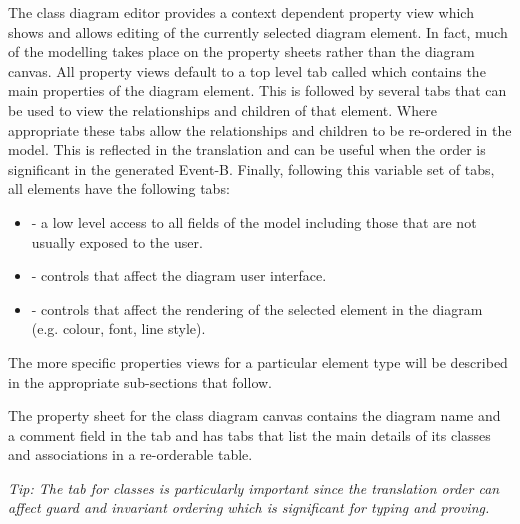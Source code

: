 \documentclass[a4paper,10pt]{article}
\begin{document}
The class diagram editor provides a context dependent property view which shows and allows editing of the currently selected diagram element.
In fact, much of the modelling takes place on the property sheets rather than the diagram canvas.
All property views default to a top level tab called  which contains the main properties of the diagram element.
This is followed by several tabs that can be used to view the relationships and children of that element.
Where appropriate these tabs allow the relationships and children to be re-ordered in the model.
This is reflected in the translation and can be useful when the order is significant in the generated Event-B.
Finally, following this variable set of tabs, all elements have the following tabs:
\begin{itemize}
	\item {} - a low level access to all fields of the model including those that are not usually exposed to the user.
	\item {} - controls that affect the diagram user interface.
	\item {} - controls that affect the rendering of the selected element in the diagram (e.g. colour, font, line style).
\end{itemize}
The more specific properties views for a particular element type will be described in the appropriate sub-sections that follow. 

The property sheet for the class diagram canvas contains the diagram name and a comment field in the  tab and has tabs that list the main details of its classes and associations in a re-orderable table.

\emph{Tip: The tab for classes is particularly important since the translation order can affect guard and invariant ordering which is significant for typing and proving.}


	
	
	
	
	
	
	
	
	
	
\end{document}
